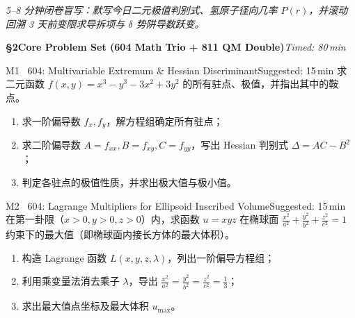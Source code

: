 \documentclass[a4paper,11pt]{article}
\begin{document}
\vspace{4pt}

\begin{tcolorbox}[
  enhanced, colback=white, colframe=border, boxrule=0.6pt, arc=2mm,
  left=4mm, right=4mm, top=3mm, bottom=3mm,
  fonttitle=\sffamily\bfseries\color{slate},
  title={\raisebox{0pt}{\color{royal}\rule{3pt}{10pt}}\hspace{4pt}Warm-Up Retrieval Workspace \textbar\ 白纸破冰与间隔提取草稿区},
  colbacktitle=paper, coltitle=slate,
  titlerule=0pt, toptitle=2mm, bottomtitle=2mm
]
\textcolor{mist}{\footnotesize\itshape 5--8 分钟闭卷盲写：默写今日二元极值判别式、氢原子径向几率 $P(r)$，并滚动回溯 3 天前变限求导拆项与 $\delta$ 势阱导数跃变。}
\vspace{9.0cm}
\end{tcolorbox}

\clearpage

{\Large\sffamily\bfseries\color{navy} \S 2\quad Core Problem Set (604 Math Trio + 811 QM Double)}\hfill{\small\sffamily\color{mist}\itshape Timed: 80\,min}

\vspace{5pt}

\begin{problem}{M1 \textbar\ 604: Multivariable Extremum \& Hessian Discriminant}{Suggested: 15\,min}
求二元函数 $f(x, y) = x^3 - y^3 - 3x^2 + 3y^2$ 的所有驻点、极值，并指出其中的鞍点。
\begin{enumerate}[leftmargin=1.5em,itemsep=1pt,topsep=1pt]
  \item 求一阶偏导数 $f_x, f_y$，解方程组确定所有驻点；
  \item 求二阶偏导数 $A = f_{xx}, B = f_{xy}, C = f_{yy}$，写出 Hessian 判别式 $\Delta = AC - B^2$；
  \item 判定各驻点的极值性质，并求出极大值与极小值。
\end{enumerate}
\end{problem}

\vspace{3pt}

\begin{problem}{M2 \textbar\ 604: Lagrange Multipliers for Ellipsoid Inscribed Volume}{Suggested: 15\,min}
在第一卦限（$x>0, y>0, z>0$）内，求函数 $u = xyz$ 在椭球面 $\frac{x^2}{a^2} + \frac{y^2}{b^2} + \frac{z^2}{c^2} = 1$ 约束下的最大值（即椭球面内接长方体的最大体积）。
\begin{enumerate}[leftmargin=1.5em,itemsep=1pt,topsep=1pt]
  \item 构造 Lagrange 函数 $L(x, y, z, \lambda)$，列出一阶偏导方程组；
  \item 利用乘变量法消去乘子 $\lambda$，导出 $\frac{x^2}{a^2} = \frac{y^2}{b^2} = \frac{z^2}{c^2} = \frac{1}{3}$；
  \item 求出最大值点坐标及最大体积 $u_{\max}$。
\end{enumerate}
\end{problem}
\end{document}
